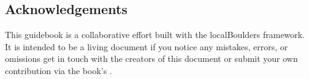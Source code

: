 \raggedcolumns
\begin{multicols}{2}

\section{Acknowledgements}
This guidebook is a collaborative effort built with the localBoulders framework. It is intended to be a living document if you notice any mistakes, errors, or omissions get in touch with the creators of this document or submit your own contribution via the book's .
\end{multicols}
\clearpage
